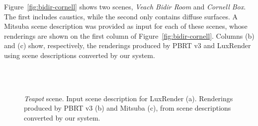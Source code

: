 Figure~\ref{fig:bidir-cornell} shows two scenes, \textit{Veach Bidir Room} and \textit{Cornell Box}. The first includes caustics, while the second only contains diffuse surfaces. A Mitsuba scene description was provided as input for each of these scenes, whose renderings are shown on the first column of Figure~\ref{fig:bidir-cornell}. Columns (b) and (c) show, respectively, the renderings produced by PBRT v3 and LuxRender using scene descriptions converted by our system.    



\begin{figure}
  \centering
  \\
  \\
  \caption{\textit{Teapot} scene. Input scene description for LuxRender (a). Renderings produced by PBRT v3 (b) and Mitsuba (c), from scene descriptions converted by our system.}
  \label{fig:teapot}
\end{figure}

